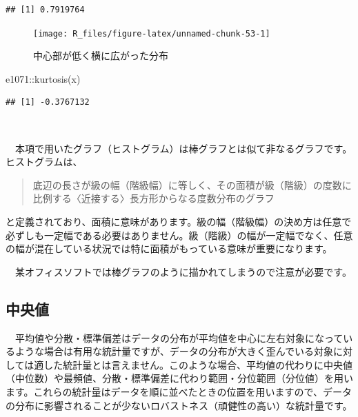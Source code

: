\documentclass[
  12pt,
]{book}
\newenvironment{Shaded}{\begin{snugshade}}{\end{snugshade}}
\newcommand{\FunctionTok}[1]{\textcolor[rgb]{0.00,0.00,0.00}{#1}}
\newcommand{\NormalTok}[1]{#1}
\newcommand{\SpecialCharTok}[1]{\textcolor[rgb]{0.00,0.00,0.00}{#1}}
\begin{document}
\begin{verbatim}
## [1] 0.7919764
\end{verbatim}

\begin{figure}[H]

{\centering \texttt{[image: R\_files/figure-latex/unnamed-chunk-53-1]} 

}

\caption{中心部が低く横に広がった分布}\label{fig:unnamed-chunk-53}
\end{figure}

\begin{Shaded}
\begin{Highlighting}[numbers=left,,]
\NormalTok{e1071}\SpecialCharTok{::}\FunctionTok{kurtosis}\NormalTok{(x)}
\end{Highlighting}
\end{Shaded}

\begin{verbatim}
## [1] -0.3767132
\end{verbatim}

　

\begin{hint-box}
　本項で用いたグラフ（ヒストグラム）は棒グラフとは似て非なるグラフです。ヒストグラムは、

\begin{quote}
底辺の長さが級の幅（階級幅）に等しく、その面積が級（階級）の度数に比例する〈近接する〉長方形からなる度数分布のグラフ
\end{quote}

と定義されており、面積に意味があります。級の幅（階級幅）の決め方は任意で必ずしも一定幅である必要はありません。級（階級）の幅が一定幅でなく、任意の幅が混在している状況では特に面積がもっている意味が重要になります。

　某オフィスソフトでは棒グラフのように描かれてしまうので注意が必要です。

\end{hint-box}

\newpage

\hypertarget{ux4e2dux592eux5024}{%
\subsection{\texorpdfstring{中央値}{中央値}}\label{ux4e2dux592eux5024}}

　平均値や分散・標準偏差はデータの分布が平均値を中心に左右対象になっているような場合は有用な統計量ですが、データの分布が大きく歪んでいる対象に対しては適した統計量とは言えません。このような場合、平均値の代わりに中央値（中位数）や最頻値、分散・標準偏差に代わり範囲・分位範囲（分位値）を用います。これらの統計量はデータを順に並べたときの位置を用いますので、データの分布に影響されることが少ないロバストネス（頑健性の高い）な統計量です。
\end{document}

